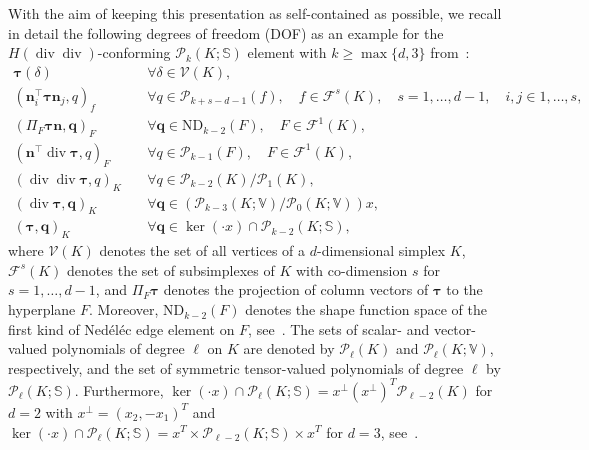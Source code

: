 \documentclass[11pt]{amsart}
\theoremstyle{remark}
\theoremstyle{definition}
\renewcommand{\div}{\operatorname{div}}
\renewcommand{\div}{\operatorname{div}}
\def\P{\mathcal P}
\begin{document}
With the aim of keeping this presentation as self-contained as possible, we recall in detail the following degrees of freedom (DOF) as an example for the $H(\div\div)$-conforming  
$\P_k(K ; \mathbb{S})$ element  with $k\geq \max\{ d,3\}$ from~\cite{ChenHuang2022}:
%
\begin{align}
\boldsymbol{\tau}(\delta) & \quad \forall \delta \in \mathcal{V}(K), \label{DOF0}\\
\left(\boldsymbol{n}_i^{\top} \boldsymbol{\tau} \boldsymbol{n}_j, q\right)_f &\quad \forall q \in \P_{k+s-d-1}(f),
\quad f \in \mathcal{F}^s(K), \quad s=1, \ldots, d-1, \quad i, j \in {1, \ldots, s}, \label{DOF1}  \\
%
\left(\Pi_F \boldsymbol{\tau} \boldsymbol{n}, \boldsymbol{q}\right)_F &\quad \forall \boldsymbol{q} \in \mathrm{ND}_{k-2}(F), \quad F \in \mathcal{F}^1(K), \label{DOF2}  \\
%
\left(\boldsymbol{n}^{\top} \operatorname{div} \boldsymbol{\tau}, q\right)_F & \quad \forall q \in \P_{k-1}(F), 
\quad F \in \mathcal{F}^1(K), \label{DOF3} \\
%
(\div \div \boldsymbol{\tau}, q)_K & \quad \forall q \in \P_{k-2}(K) / \P_1(K), \\
%
(\div \boldsymbol{\tau}, \boldsymbol{q})_K & \quad \forall \boldsymbol{q} \in\left(\P_{k-3}(K ; \mathbb{V}) / \P_0(K ; \mathbb{V})\right) x, \\
%
(\boldsymbol{\tau}, \boldsymbol{q})_K & \quad \forall \boldsymbol{q} \in \operatorname{ker}(\cdot x) \cap \P_{k-2}(K ; \mathbb{S}),
\end{align}
where $\mathcal{V}(K)$ denotes the set of all vertices of a $d$-dimensional simplex $K$, $\mathcal{F}^s(K)$ denotes the set of subsimplexes of $K$ with co-dimension $s$ for $s=1, \ldots, d-1$,  and $\Pi_F\boldsymbol{\tau}$ denotes the projection of column vectors of $\boldsymbol{\tau}$ to the hyperplane $F$. Moreover,  $\mathrm{ND}_{k-2}(F)$ denotes the shape function space of the first kind of Ned\'el\'ec edge element on $F$, see~\cite{nedelec1980mixed,arnold2006finite}.
The sets of scalar- and vector-valued polynomials of degree $\ell$ on $K$ are denoted by $\P_{\ell}(K)$ and $\P_{\ell}(K ; \mathbb{V})$, respectively, and the set of symmetric tensor-valued polynomials of degree $\ell$ by $\P_{\ell}(K ; \mathbb{S})$. Furthermore, $\operatorname{ker}(\cdot x) \cap \P_{\ell}(K ; \mathbb{S})=x^\perp (x^\perp)^T\P_{\ell-2}(K)$ for $d=2$ with $x^\perp=(x_2, -x_1)^T$ and $\operatorname{ker}(\cdot x) \cap \P_{\ell}(K ; \mathbb{S})=x^T \times \P_{\ell-2}(K ; \mathbb{S})\times  x^T$ for $d=3$, see~\cite{chen2020finite,chen2022finiteele}.
\end{document}
